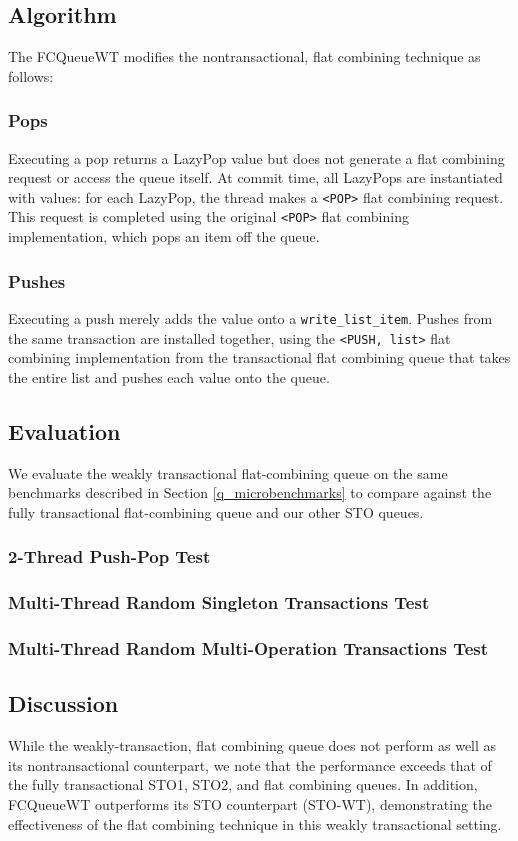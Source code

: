 \subsection{Algorithm}

The FCQueueWT modifies the nontransactional, flat combining technique as follows:
   \subsubsection{Pops} 
    Executing a pop returns a LazyPop value but does not generate a flat combining request or access the queue itself. At commit time, all LazyPops are instantiated with values: for each LazyPop, the thread makes a \texttt{<POP>} flat combining request. This request is completed using the original \texttt{<POP>} flat combining implementation, which pops an item off the queue.

    \subsubsection{Pushes}
    Executing a push merely adds the value onto a \texttt{write\_list\_item}. Pushes from the same transaction are installed together, using the \texttt{<PUSH, list>} flat combining implementation from the transactional flat combining queue that takes the entire list and pushes each value onto the queue.


\subsection{Evaluation}
%

We evaluate the weakly transactional flat-combining queue on the same benchmarks described in Section \ref{q_microbenchmarks} to compare against the fully transactional flat-combining queue and our other STO queues.

\subsubsection{2-Thread Push-Pop Test}

\subsubsection{Multi-Thread Random Singleton Transactions Test}

\subsubsection{Multi-Thread Random Multi-Operation Transactions Test}

\subsection{Discussion}
While the weakly-transaction, flat combining queue does not perform as well as its nontransactional counterpart, we note that the performance exceeds that of the fully transactional STO1, STO2, and flat combining queues. In addition, FCQueueWT outperforms its STO counterpart (STO-WT), demonstrating the effectiveness of the flat combining technique in this weakly transactional setting.
